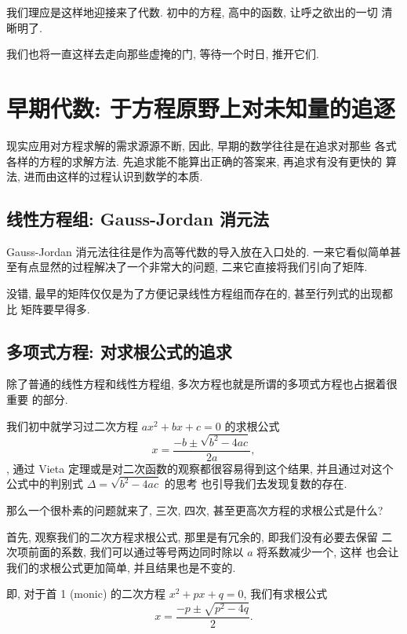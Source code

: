\documentclass[UTF8]{book}
\begin{document}
我们理应是这样地迎接来了代数. 初中的方程, 高中的函数, 让呼之欲出的一切
清晰明了.

我们也将一直这样去走向那些虚掩的门, 等待一个时日, 推开它们. 

\section{早期代数: 于方程原野上对未知量的追逐}
现实应用对方程求解的需求源源不断, 因此, 早期的数学往往是在追求对那些
各式各样的方程的求解方法. 先追求能不能算出正确的答案来, 再追求有没有更快的
算法, 进而由这样的过程认识到数学的本质. 

\subsection{线性方程组: Gauss-Jordan 消元法}
Gauss-Jordan 消元法往往是作为高等代数的导入放在入口处的. 
一来它看似简单甚至有点显然的过程解决了一个非常大的问题, 
二来它直接将我们引向了矩阵. 

没错, 最早的矩阵仅仅是为了方便记录线性方程组而存在的, 甚至行列式的出现都比
矩阵要早得多. 

\subsection{多项式方程: 对求根公式的追求}
除了普通的线性方程和线性方程组, 多次方程也就是所谓的多项式方程也占据着很重要
的部分. 

我们初中就学习过二次方程 $ a x^2 + b x + c = 0 $ 的求根公式
\begin{equation}
    x = \frac{-b \pm \sqrt{b^2 - 4ac}}{2a},
\end{equation}, 
通过 Vieta 定理或是对二次函数的观察都很容易得到这个结果, 
并且通过对这个公式中的判别式 $\Delta =  \sqrt{b^2 - 4ac}$ 的思考
也引导我们去发现复数的存在. 

那么一个很朴素的问题就来了, 三次, 四次, 甚至更高次方程的求根公式是什么? 

首先, 观察我们的二次方程求根公式, 那里是有冗余的, 即我们没有必要去保留
二次项前面的系数, 我们可以通过等号两边同时除以 $a$ 将系数减少一个, 这样
也会让我们的求根公式更加简单, 并且结果也是不变的.

即, 对于首 1 (monic) 的二次方程 $ x^2 + px + q = 0 $, 我们有求根公式
\begin{equation}
    x = \frac{-p \pm \sqrt{p^2 - 4q}}{2}.
\end{equation}
\end{document}
